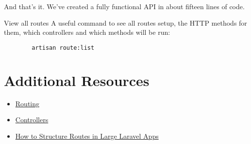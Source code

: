 \hr

And that's it. We've created a fully functional API in about fifteen lines of code.



\begin{infobox}{View all routes}
    A useful command to see all routes setup, the HTTP methods for them, which controllers and which methods will be run:

    \begin{verbatim}
        artisan route:list
    \end{verbatim}

\end{infobox}

\section{Additional Resources}

\begin{itemize}[leftmargin=*]
    \item \href{https://laravel.com/docs/master/routing}{Routing}
    \item \href{http://laravel.com/docs/master/controllers}{Controllers}
    \item \href{https://laraveldaily.com/how-to-structure-routes-in-large-laravel-projects/}{How to Structure Routes in Large Laravel Apps}
\end{itemize}
